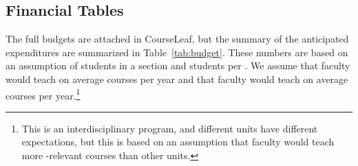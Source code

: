 \subsection{Financial Tables}

The full budgets are attached in CourseLeaf, but the summary of the anticipated expenditures are summarized in Table~\ref{tab:budget}.  These numbers are based on an assumption of \StudentsperSection{} students in a section and \StudentsperTA{} students per .  We assume that  faculty would teach on average \PTKLoad{} courses per year and that  faculty would teach on average \TTKLoad{} courses per year.\footnote{This is an interdisciplinary program, and different units have different expectations, but this is based on an assumption that  faculty would teach more -relevant courses than other units.}